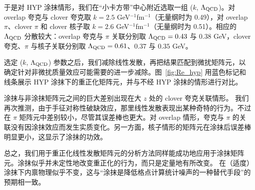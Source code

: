 于是对 HYP 涂抹情形，我们在“小卡方带”中心附近选取一组 ($k$, $\Lambda_{\rm QCD}$)。对 overlap 夸克与 clover 夸克取 $k=2.5$ GeV$^{-1}$fm$^{-1}$（无量纲时为 0.49），对 overlap $\pi$、clover $\pi$ 和 clover 核子取 $k=2.6$ GeV$^{-1}$fm$^{-1}$（无量纲时为 0.51）。相应的 $\Lambda_{\rm QCD}$ 分散较大：overlap 夸克与 $\pi$ 关联分别取 $\Lambda_{\rm QCD} = 0.43$ 与 $0.38$ GeV，clover 夸克、$\pi$ 与核子关联分别取 $\Lambda_{\rm QCD} = 0.61$、$0.37$ 与 $0.35$ GeV。

选定 ($k$, $\Lambda_{\rm QCD}$) 参数之后，我们减除线性发散，再把结果匹配到微扰矩阵元，以确定针对非微扰质量效应可能需要的进一步减除。图~\ref{fig:Re_hyp} 用蓝色标记和线条展示 HYP 涂抹下的重正化矩阵元，并与不经 HYP 涂抹的情形进行对比。

涂抹与非涂抹矩阵元之间的巨大差别出现在大 $z$ 处的 clover 夸克关联情形。
我们再次推测，由于手征对称性破缺效应，那里线性发散表现出某种奇特的行为。不过在 $\pi$ 矩阵元中差别较小，尽管其误差棒也更大。对 overlap 情形，夸克与 $\pi$ 的关联没有因涂抹效应而发生实质变化。另一方面，核子情形的矩阵元在涂抹后误差棒明显更小，这显示了涂抹的功效。

总之，我们用于重正化线性发散矩阵元的分析方法同样能成功地应用于涂抹矩阵元。涂抹似乎并未定性地改变重正化的行为，而只是定量地有所改变。
在（适度）涂抹下内禀物理似乎不变，这与“涂抹是降低格点计算统计噪声的一种替代手段”的预期相一致。
